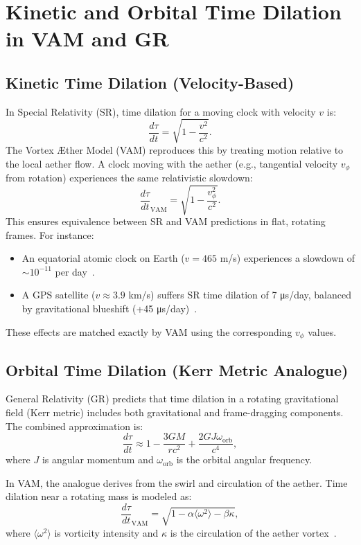 \section{Kinetic and Orbital Time Dilation in VAM and GR}

\subsection{Kinetic Time Dilation (Velocity-Based)}

In Special Relativity (SR), time dilation for a moving clock with velocity $v$ is:
\[
    \frac{d\tau}{dt} = \sqrt{1 - \frac{v^2}{c^2}}.
\]
The Vortex Æther Model (VAM) reproduces this by treating motion relative to the local aether flow. A clock moving with the aether (e.g., tangential velocity $v_\phi$ from rotation) experiences the same relativistic slowdown:
\[
    \frac{d\tau}{dt}_{\text{VAM}} = \sqrt{1 - \frac{v_\phi^2}{c^2}}.
\]
This ensures equivalence between SR and VAM predictions in flat, rotating frames. For instance:
\begin{itemize}
    \item An equatorial atomic clock on Earth ($v=465$ m/s) experiences a slowdown of $\sim 10^{-11}$ per day~\cite{ashby2003relativity}.
    \item A GPS satellite ($v \approx 3.9$ km/s) suffers SR time dilation of 7 μs/day, balanced by gravitational blueshift (+45 μs/day)~\cite{ashby2003relativity}.
\end{itemize}
These effects are matched exactly by VAM using the corresponding $v_\phi$ values.

\subsection{Orbital Time Dilation (Kerr Metric Analogue)}

General Relativity (GR) predicts that time dilation in a rotating gravitational field (Kerr metric) includes both gravitational and frame-dragging components. The combined approximation is:
\[
    \frac{d\tau}{dt} \approx 1 - \frac{3GM}{rc^2} + \frac{2GJ\omega_{\text{orb}}}{c^4},
\]
where $J$ is angular momentum and $\omega_{\text{orb}}$ is the orbital angular frequency.

In VAM, the analogue derives from the swirl and circulation of the aether. Time dilation near a rotating mass is modeled as:
\[
    \frac{d\tau}{dt}_{\text{VAM}} = \sqrt{1 - \alpha \langle \omega^2 \rangle - \beta \kappa},
\]
where $\langle \omega^2 \rangle$ is vorticity intensity and $\kappa$ is the circulation of the aether vortex~\cite{grin3d2025}.

